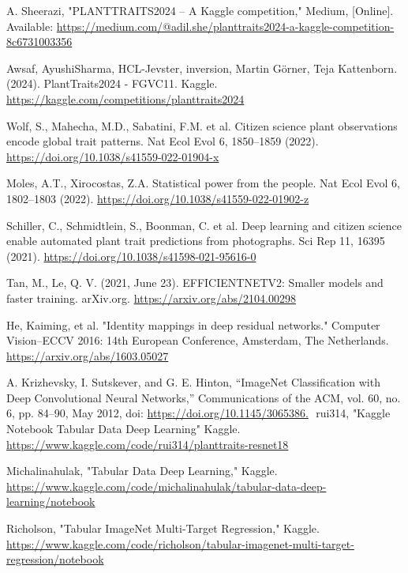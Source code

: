 \documentclass[conference]{IEEEtran}
\begin{document}
\begin{thebibliography}{1}

A. Sheerazi, "PLANTTRAITS2024 -- A Kaggle competition," Medium, [Online]. Available: \url{https://medium.com/@adil.she/planttraits2024-a-kaggle-competition-8c6731003356}

Awsaf, AyushiSharma, HCL-Jevster, inversion, Martin Görner, Teja Kattenborn. (2024). PlantTraits2024 - FGVC11. Kaggle. \url{https://kaggle.com/competitions/planttraits2024}

Wolf, S., Mahecha, M.D., Sabatini, F.M. et al. Citizen science plant observations encode global trait patterns. Nat Ecol Evol 6, 1850–1859 (2022). \url{https://doi.org/10.1038/s41559-022-01904-x}

Moles, A.T., Xirocostas, Z.A. Statistical power from the people. Nat Ecol Evol 6, 1802–1803 (2022). \url{https://doi.org/10.1038/s41559-022-01902-z}

Schiller, C., Schmidtlein, S., Boonman, C. et al. Deep learning and citizen science enable automated plant trait predictions from photographs. Sci Rep 11, 16395 (2021). \url{https://doi.org/10.1038/s41598-021-95616-0}

Tan, M., Le, Q. V. (2021, June 23). EFFICIENTNETV2: Smaller models and faster training. arXiv.org. \url{https://arxiv.org/abs/2104.00298}

He, Kaiming, et al. "Identity mappings in deep residual networks." Computer Vision–ECCV 2016: 14th European Conference, Amsterdam, The Netherlands.
\url{https://arxiv.org/abs/1603.05027}

A. Krizhevsky, I. Sutskever, and G. E. Hinton, “ImageNet Classification with Deep Convolutional Neural Networks,” Communications of the ACM, vol. 60, no. 6, pp. 84–90, May 2012, doi: \url{https://doi.org/10.1145/3065386.}
‌
rui314, "Kaggle Notebook Tabular Data Deep Learning" Kaggle. \url{https://www.kaggle.com/code/rui314/planttraits-resnet18}

Michalinahulak, "Tabular Data Deep Learning," Kaggle. \url{https://www.kaggle.com/code/michalinahulak/tabular-data-deep-learning/notebook}

Richolson, "Tabular ImageNet Multi-Target Regression," Kaggle. \url{https://www.kaggle.com/code/richolson/tabular-imagenet-multi-target-regression/notebook}


\end{thebibliography}
\end{document}
